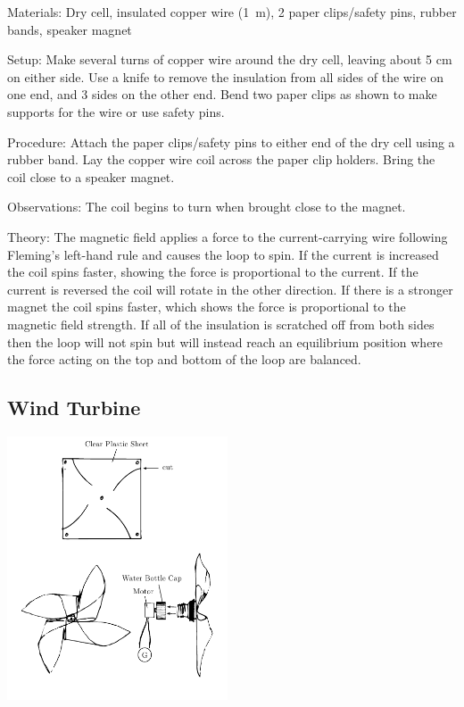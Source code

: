 \begin{multicols}{2}
\begin{description*}
\item[Materials:]{Dry cell, insulated copper wire (1~m), 2 paper clips/safety pins, rubber bands, speaker magnet}
\item[Setup:]{Make several turns of copper wire around the dry cell, leaving about 5 cm on either side. Use a knife to remove the insulation from all sides of the wire on one end, and 3 sides on the other end. Bend two paper clips as shown to make supports for the wire or use safety pins.}
\item[Procedure:]{Attach the paper clips/safety pins to either end of the dry cell using a rubber band. Lay the copper wire coil across the paper clip holders. Bring the coil close to a speaker magnet.}
\item[Observations:]{The coil begins to turn when brought close to the magnet.}
\item[Theory:]{The magnetic field applies a force to the current-carrying wire following Fleming's left-hand rule and causes the loop to spin. If the current is increased the coil spins faster, showing the force is proportional to the current. If the current is reversed the coil will rotate in the other direction. If there is a stronger magnet the coil spins faster, which shows the force is proportional to the magnetic field strength. If all of the insulation is scratched off from both sides then the loop will not spin but will instead reach an equilibrium position where the force acting on the top and bottom of the loop are balanced.}
\end{description*}

\columnbreak

\subsection{Wind Turbine}  
\label{sub:wind-turbine}

\begin{center}
\includegraphics[width=0.49\textwidth]{./img/wind-turbine.png}
\end{center}


\end{multicols}
